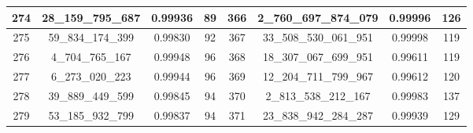 \documentclass[letterpaper]{article}
\begin{document}
{\begin{tabular}{|c c c c| c c c c|}
        \hline
        274             & 28\_159\_795\_687  & 0.99936          & 89              & 366          & 2\_760\_697\_874\_079  & 0.99996          & 126             \\
        \hline
        275             & 59\_834\_174\_399  & 0.99830          & 92              & 367          & 33\_508\_530\_061\_951 & 0.99998          & 119             \\
        \hline
        276             & 4\_704\_765\_167   & 0.99948          & 96              & 368          & 18\_307\_067\_699\_951 & 0.99611          & 119             \\
        \hline
        277             & 6\_273\_020\_223   & 0.99944          & 96              & 369          & 12\_204\_711\_799\_967 & 0.99612          & 120             \\
        \hline
        278             & 39\_889\_449\_599  & 0.99845          & 94              & 370          & 2\_813\_538\_212\_167  & 0.99983          & 137             \\
        \hline
        279             & 53\_185\_932\_799  & 0.99837          & 94              & 371          & 23\_838\_942\_284\_287 & 0.99939          & 129             \\
        \hline
    \end{tabular}
}
\end{document}
